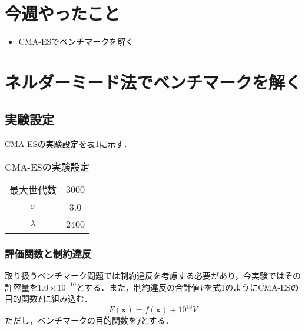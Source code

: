 \documentclass[twocolumn]{jarticle}
\begin{document}


\section{今週やったこと}
\begin{itemize}
  \item CMA-ESでベンチマークを解く
\end{itemize}
	
\section{ネルダーミード法でベンチマークを解く}
	\subsection{実験設定}
	CMA-ESの実験設定を表1に示す．
	\begin{table}[htbp]
		\begin{center}
			\caption{CMA-ESの実験設定}
			\begin{tabular}{| c | c |} \hline
				最大世代数 & 3000 \\
 				$\sigma$ & 3.0 \\
				$\lambda$ & 2400 \\ \hline
				
			\end{tabular}
		\end{center}
	\end{table}
	
	\subsubsection{評価関数と制約違反}
	取り扱うベンチマーク問題では制約違反を考慮する必要があり，今実験ではその許容量を$1.0\times10^{-10}$とする．また，制約違反の合計値$V$を式1のようにCMA-ESの目的関数$F$に組み込む．
	\begin{equation}
		F(\bm{x}) = f(\bm{x}) +  10^{16}V 
	\end{equation}
	ただし，ベンチマークの目的関数を$f$とする．
	
\end{document}
